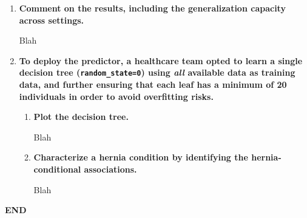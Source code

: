 \documentclass[12pt]{article}
\begin{document}
\begin{enumerate}[leftmargin=\labelsep]
    \item \textbf{Comment on the results, including the generalization capacity across settings.}

          Blah

    \item \textbf{To deploy the predictor, a healthcare team opted to learn a single decision tree
          (\texttt{random\_state=0}) using \textit{all} available data as training data, and further ensuring that each leaf has
          a minimum of 20 individuals in order to avoid overfitting risks.}
          \begin{enumerate}
          \item \textbf{Plot the decision tree.}

          Blah

          \item \textbf{Characterize a hernia condition by identifying the hernia-conditional associations.}

          Blah
          \end{enumerate}
\end{enumerate}

\vskip 1cm
\center\textbf{END}
\end{document}
